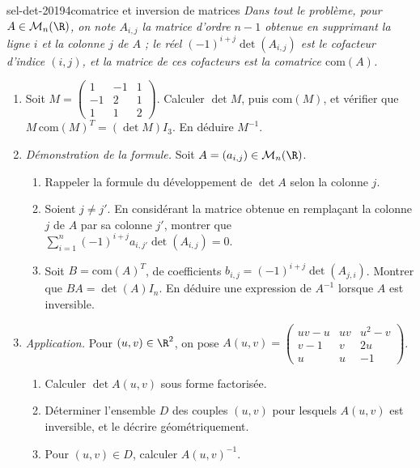 \begin{exo}{sel-det-2019}{4}{comatrice et inversion de matrices}
\emph{Dans tout le problème, pour $A\in\mathcal M_n(\R)$, on note $A_{i,j}$ la matrice d'ordre $n-1$ obtenue en supprimant la ligne $i$ et la colonne $j$ de $A$ ; le réel $(-1)^{i+j}\det(A_{i,j})$ est le cofacteur d'indice $(i,j)$, et la matrice de ces cofacteurs est la \emph{comatrice} $\mathrm{com}(A)$.}
\begin{enumerate}
\item Soit $M=\begin{pmatrix}1&-1&1\\-1&2&1\\1&1&2\end{pmatrix}$. Calculer $\det M$, puis $\mathrm{com}(M)$, et vérifier que $M\,\mathrm{com}(M)^T=(\det M)I_3$. En déduire $M^{-1}$.
\item \emph{Démonstration de la formule.} Soit $A=(a_{i,j})\in\mathcal M_n(\R)$.
\begin{enumerate}
\item Rappeler la formule du développement de $\det A$ selon la colonne $j$.
\item Soient $j\neq j'$. En considérant la matrice obtenue en remplaçant la colonne $j$ de $A$ par sa colonne $j'$, montrer que $\sum_{i=1}^n(-1)^{i+j}a_{i,j'}\det(A_{i,j})=0$.
\item Soit $B=\mathrm{com}(A)^T$, de coefficients $b_{i,j}=(-1)^{i+j}\det(A_{j,i})$. Montrer que $BA=\det(A)I_n$. En déduire une expression de $A^{-1}$ lorsque $A$ est inversible.
\end{enumerate}
\item \emph{Application.} Pour $(u,v)\in\R^2$, on pose $A(u,v)=\begin{pmatrix}uv-u&uv&u^2-v\\v-1&v&2u\\u&u&-1\end{pmatrix}$.
\begin{enumerate}
\item Calculer $\det A(u,v)$ sous forme factorisée.
\item Déterminer l'ensemble $D$ des couples $(u,v)$ pour lesquels $A(u,v)$ est inversible, et le décrire géométriquement.
\item Pour $(u,v)\in D$, calculer $A(u,v)^{-1}$.
\end{enumerate}
\end{enumerate}
\end{exo}

